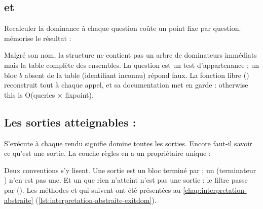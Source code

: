 \subsection{ et }

Recalculer la dominance à chaque question coûte un point fixe par question.
 mémorise le résultat :


Malgré son nom, la structure ne contient pas un arbre de dominateurs
immédiats mais la table complète des ensembles. La question
 est un test d'appartenance ; un bloc $b$ absent de la
table (identifiant inconnu) répond faux. La fonction libre
 () reconstruit
tout à chaque appel, et sa documentation met en garde : \og otherwise this is
O(queries × fixpoint)\fg.

\subsection{Les sorties atteignables : }

\og S'exécute à chaque rendu\fg{} signifie \og domine toutes les sorties\fg.
Encore faut-il savoir ce qu'est une sortie. La couche règles en a un
propriétaire unique :


Deux conventions s'y lisent. Une sortie est un bloc terminé par
 ; un  (terminateur ) n'en est pas
une. Et un  que rien n'atteint n'est pas une sortie : le filtre
passe par  (). Les
méthodes  et  qui suivent ont été
présentées au \cref{chap:interpretation-abstraite}
(\cref{lst:interpretation-abstraite-exitdom}).

